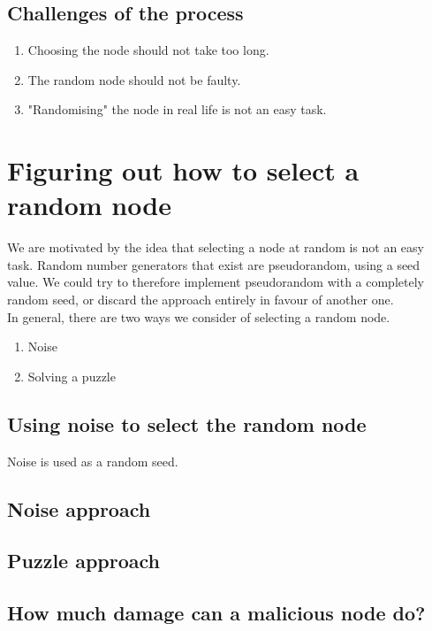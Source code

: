 \documentclass[10pt,a4paper]{article}
\begin{document}
\subsection{Challenges of the process}
\begin{enumerate}
\item Choosing the node should not take too long.

\item The random node should not be faulty.

\item "Randomising" the node in real life is not an easy task.
\end{enumerate}


\section{Figuring out how to select a random node}
We are motivated by the idea that selecting a node at random is not an easy task. Random number generators that exist are pseudorandom, using a seed value. We could try to therefore implement pseudorandom with a completely random seed, or discard the approach entirely in favour of another one.\\
In general, there are two ways we consider of selecting a random node. 
\begin{enumerate}
\item Noise

\item Solving a puzzle
\end{enumerate}

\subsection{Using noise to select the random node}
Noise is used as a random seed. 



\subsection{Noise approach}
\subsection{Puzzle approach}
\subsection{How much damage can a malicious node do?}
\end{document}
